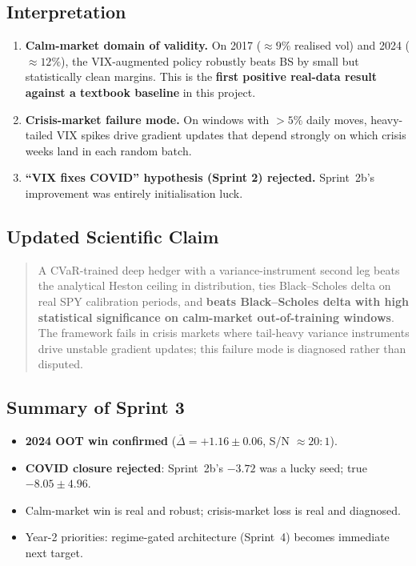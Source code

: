 \documentclass[11pt, a4paper]{article}
\begin{document}
\subsection{Interpretation}

\begin{enumerate}
\item \textbf{Calm-market domain of validity.} On 2017 ($\approx 9\%$ realised vol) and
      2024 ($\approx 12\%$), the VIX-augmented policy robustly beats BS by small but
      statistically clean margins. This is the \textbf{first positive real-data result
      against a textbook baseline} in this project.
\item \textbf{Crisis-market failure mode.} On windows with $>5\%$ daily moves,
      heavy-tailed VIX spikes drive gradient updates that depend strongly on
      which crisis weeks land in each random batch.
\item \textbf{``VIX fixes COVID'' hypothesis (Sprint 2) rejected.} Sprint~2b's
      improvement was entirely initialisation luck.
\end{enumerate}

\subsection{Updated Scientific Claim}

\begin{quote}
A CVaR-trained deep hedger with a variance-instrument second leg beats the
analytical Heston ceiling in distribution, ties Black--Scholes delta on real SPY
calibration periods, and \textbf{beats Black--Scholes delta with high statistical
significance on calm-market out-of-training windows}. The framework fails in
crisis markets where tail-heavy variance instruments drive unstable gradient
updates; this failure mode is diagnosed rather than disputed.
\end{quote}

\subsection{Summary of Sprint 3}
\begin{itemize}
\item \textbf{2024 OOT win confirmed} ($\overline{\Delta} = +1.16 \pm 0.06$, S/N $\approx 20{:}1$).
\item \textbf{COVID closure rejected}: Sprint~2b's $-3.72$ was a lucky seed; true $-8.05 \pm 4.96$.
\item Calm-market win is real and robust; crisis-market loss is real and diagnosed.
\item Year-2 priorities: regime-gated architecture (Sprint~4) becomes immediate next target.
\end{itemize}
\end{document}
